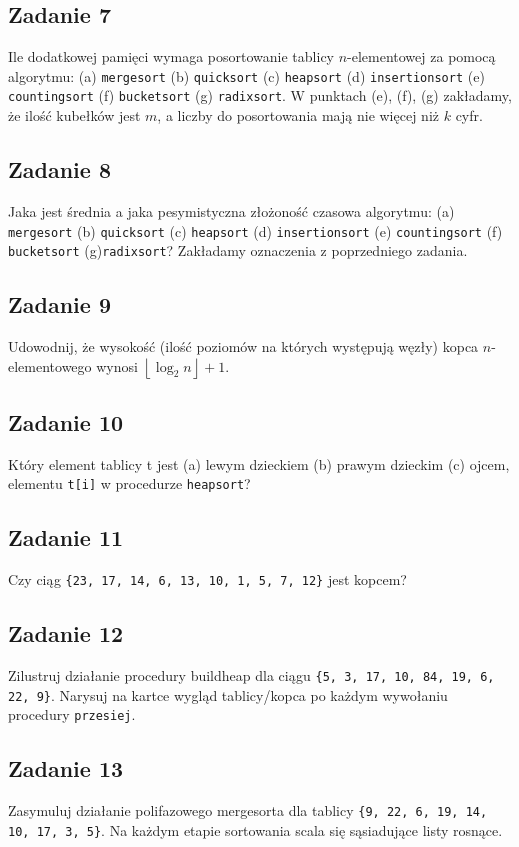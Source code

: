 \documentclass{article}
\begin{document}
\subsection*{Zadanie 7}
Ile dodatkowej pamięci wymaga posortowanie tablicy $n$-elementowej za pomocą
algorytmu: (a) \verb+mergesort+ (b) \verb+quicksort+ (c) \verb+heapsort+ (d) \verb+insertionsort+ (e) \verb+countingsort+
(f) \verb+bucketsort+ (g) \verb+radixsort+. W punktach (e), (f), (g) zakładamy, że ilość kubełków
jest $m$, a liczby do posortowania mają nie więcej niż $k$ cyfr.

\subsection*{Zadanie 8}
Jaka jest średnia a jaka pesymistyczna złożoność czasowa algorytmu: (a) \verb+mergesort+ (b) \verb+quicksort+
(c) \verb+heapsort+ (d) \verb+insertionsort+ (e) \verb+countingsort+ (f) \verb+bucketsort+ (g)\verb+radixsort+?
Zakładamy oznaczenia z poprzedniego zadania.

\subsection*{Zadanie 9}
Udowodnij, że wysokość (ilość poziomów na których występują węzły) kopca $n$-elementowego
wynosi $\left \lfloor \log_2 n \right \rfloor + 1$.

\subsection*{Zadanie 10}
Który element tablicy t jest (a) lewym dzieckiem (b) prawym dzieckim (c) ojcem, elementu \verb+t[i]+ w procedurze \verb+heapsort+?

\subsection*{Zadanie 11}
Czy ciąg \verb+{23, 17, 14, 6, 13, 10, 1, 5, 7, 12}+ jest kopcem?

\subsection*{Zadanie 12}
Zilustruj działanie procedury buildheap dla ciągu \verb+{5, 3, 17, 10, 84, 19, 6, 22, 9}+.
Narysuj na kartce wygląd tablicy/kopca po każdym wywołaniu procedury \verb+przesiej+.

\subsection*{Zadanie 13}
Zasymuluj działanie polifazowego mergesorta dla tablicy \verb+{9, 22, 6, 19, 14, 10, 17, 3, 5}+.
Na każdym etapie sortowania scala się sąsiadujące listy rosnące.
\end{document}
